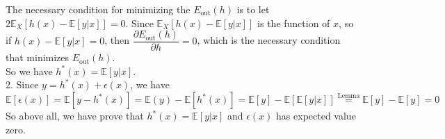 The necessary condition for minimizing the $E_{\text{out}}(h)$ is to let $2 \mathbb{E}_X\left[h(x)-\mathbb{E}\left[y|x\right]\right]=0$.
Since $\mathbb{E}_X\left[h(x)-\mathbb{E}\left[y|x\right]\right]$ is the function of $x$, so if $h(x)-\mathbb{E}\left[y|x\right]=0$, 
then $\dfrac{\partial E_{\text{out}}(h)}{\partial h}=0$, which is the necessary condition that minimizes $E_{\text{out}}(h)$.\\
So we have $h^*(x)=\mathbb{E}[y|x]$.\\ 

2. Since $y=h^*(x)+\epsilon(x)$, we have
$$\mathbb{E}[\epsilon(x)]=\mathbb{E}[y-h^*(x)]=\mathbb{E}(y)-\mathbb{E}[h^*(x)]=\mathbb{E}[y]-\mathbb{E}\left[\mathbb{E}[y|x]\right]\stackrel{\text{Lemma}}{=}\mathbb{E}[y]-\mathbb{E}[y]=0$$
So above all, we have prove that $h^*(x)=\mathbb{E}[y|x]$ and $\epsilon(x)$ has expected value zero.\\
\newpage